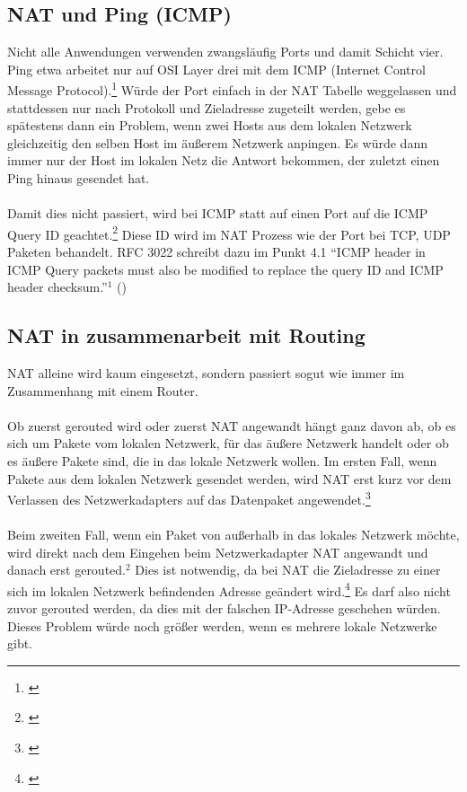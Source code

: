 \subsection{NAT und Ping (ICMP)}
Nicht alle Anwendungen verwenden zwangsläufig Ports und damit Schicht vier. Ping etwa arbeitet nur auf OSI Layer drei mit dem ICMP (Internet Control Message Protocol).\footnote[3]{\cite[Vgl.][]{NAT7}} Würde der Port einfach in der NAT Tabelle weggelassen und stattdessen nur nach Protokoll und Zieladresse zugeteilt werden, gebe es spätestens dann ein Problem, wenn zwei Hosts aus dem lokalen Netzwerk gleichzeitig den selben Host im äußerem Netzwerk anpingen. Es würde dann immer nur der Host im lokalen Netz die Antwort bekommen, der zuletzt einen Ping hinaus gesendet hat. 
\\\\
Damit dies nicht passiert, wird bei ICMP statt auf einen Port auf die ICMP Query ID geachtet.\footnote[1]{\cite[Vgl.][]{NAT1}} Diese ID wird im NAT Prozess wie der Port bei TCP, UDP Paketen behandelt. RFC 3022 schreibt dazu im Punkt 4.1 “ICMP header in ICMP Query packets must also be modified to replace the query ID and ICMP header checksum.”$^{1}$ (\cite{NAT1})

\subsection{NAT in zusammenarbeit mit Routing}
NAT alleine wird kaum eingesetzt, sondern passiert sogut wie immer im Zusammenhang mit einem Router. 
\\\\
Ob zuerst gerouted wird oder zuerst NAT angewandt hängt ganz davon ab, ob es sich um Pakete vom lokalen Netzwerk, für das äußere Netzwerk handelt oder ob es äußere Pakete sind, die in das lokale Netzwerk wollen.
Im ersten Fall, wenn Pakete aus dem lokalen Netzwerk gesendet werden, wird NAT erst kurz vor dem Verlassen des Netzwerkadapters auf das Datenpaket angewendet.\footnote[2]{\cite[Vgl.][]{SRV20}} 
\\\\
Beim zweiten Fall, wenn ein Paket von außerhalb in das lokales Netzwerk möchte, wird direkt nach dem Eingehen beim Netzwerkadapter NAT angewandt und danach erst gerouted.$^{2}$ Dies ist notwendig, da bei NAT die Zieladresse zu einer sich im lokalen Netzwerk befindenden Adresse geändert wird.\footnote[3]{\cite[Vgl.][]{NAT3}} Es darf also nicht zuvor gerouted werden, da dies mit der falschen IP-Adresse geschehen würden. Dieses Problem würde noch größer werden, wenn es mehrere lokale Netzwerke gibt.

